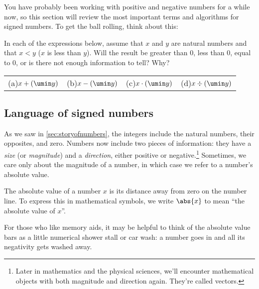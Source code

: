 You have probably been working with positive and negative numbers for a while now, so this section will review the most important terms and algorithms for signed numbers. To get the ball rolling, think about this:

\begin{boxexplore}
In each of the expressions below, assume that $x$ and $y$ are natural numbers and that $x<y$ ($x$ is less than $y$). Will the result be greater than 0, less than 0, equal to 0, or is there not enough information to tell? Why?

\begin{tabularx}{\textwidth}{YYYY}
(a)\quad $x+(\umin y)$
&
(b)\quad $x-(\umin y)$
&
(c)\quad $x \cdot (\umin y)$
&
(d)\quad $x \div (\umin y)$
\end{tabularx}
\end{boxexplore}

\subsection{Language of signed numbers}

As we saw in \cref{sec:storyofnumbers}, the integers include the natural numbers, their opposites, and zero. Numbers now include two pieces of information: they have a \textit{size} (or \textit{magnitude}) and a \textit{direction}, either positive or negative.\footnote{Later in mathematics and the physical sciences, we'll encounter mathematical objects with both magnitude and direction again. They're called vectors.} Sometimes, we care only about the magnitude of a number, in which case we refer to a number's \gls{absolute value}.

\begin{boxdef}
The absolute value of a number $x$ is its distance away from zero on the number line. To express this in mathematical symbols, we write $\abs{x}$ to mean ``the absolute value of $x$''.
\end{boxdef}

For those who like memory aids, it may be helpful to think of the absolute value bars as a little numerical shower stall or car wash: a number goes in and all its negativity gets washed away.

